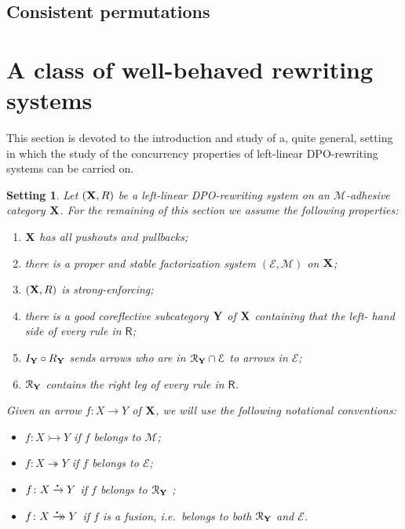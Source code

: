 \documentclass[a4paper,UKenglish,cleveref,pdftex,thm-restate,numberwithinsect]{lipics-v2021}
\newcommand{\xrightarrowdbl}[2][]{%
	\xrightarrow[#1]{#2}\mathrel{\mkern-14mu}\rightarrow
}
\newcommand{\mini}[0]{\scalebox{.4}{$\bullet$}}
\newcommand{\rto}[0]{\xrightarrow{\mini}}
\newcommand{\fto}[0]{\xrightarrowdbl{\mini}}
\newcommand{\eto}[0]{\twoheadrightarrow}
\newcommand{\mto}[0]{\rightarrowtail}
\def\R{\mathsf{R}}
\def\X{\textbf {\textup{X}}}
\def\Y{\textbf {\textup{Y}}}
\newtheorem*{setting}{Setting}
\begin{document}
\subsection{Consistent permutations}

\section{A class of well-behaved rewriting systems}
\label{sec:rewr}

This section is devoted to the introduction and study of a, quite general, setting in which the study of the concurrency properties of left-linear DPO-rewriting systems can be carried on.

\begin{setting}Let $(\X, \R)$ be a left-linear DPO-rewriting system on an $\mathcal{M}$-adhesive category $\X$. For the remaining of this section we assume the following properties:
	\begin{enumerate}
		\item $\X$ has all pushouts and pullbacks;
		\item there is a proper and stable factorization system $(\mathcal{E}, \mathcal{M})$ on $\X$;
		\item $(\X, \R)$ is strong-enforcing;
		\item there is a good coreflective subcategory $\Y$ of $\X$ containing that the left- hand side of every rule in $\R$;
		\item $ I_{\Y}\circ R_{\Y}$ sends arrows who are in  $\mathcal{R}_\Y\cap \mathcal{E}$ to arrows in $\mathcal{E}$;
		\item $\mathcal{R}_\Y $ contains the right leg of every rule in $\R$.
	\end{enumerate}
	
	Given an arrow $f\colon X\to Y$ of $\X$,  we will use the following notational conventions:
	\begin{itemize}
		\item $f\colon X\mto Y$ if $f$ belongs to $\mathcal{M}$;
		\item $f\colon X\eto Y$ if $f$ belongs to $\mathcal{E}$;
		\item $f\colon X \rto Y$ if $f$ belongs to $\mathcal{R}_\Y$ ;
		\item $f\colon X \fto Y$ if $f$ is a \emph{fusion}, i.e.~belongs to both $\mathcal{R}_\Y$ and $\mathcal{E}$. 
		\end{itemize}
\end{setting}
\end{document}
